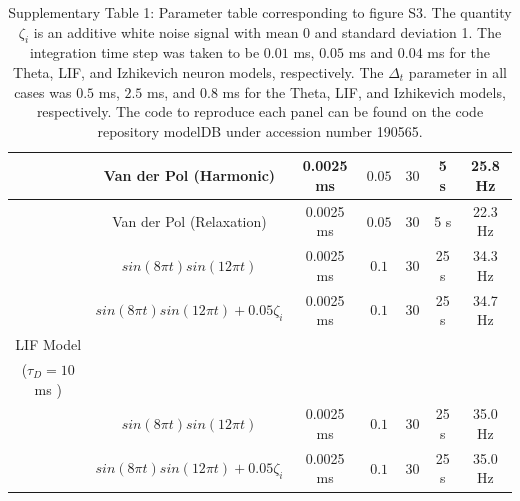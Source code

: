 \documentclass[11pt]{article} %
\begin{document}
\begin{table}
\begin{center}
\begin{tabular}{ | c | c | c | c | c | c | c | }
\hline 
 & Van der Pol (Harmonic) & 0.0025 ms & $0.05$ & $30$ & 5 s & 25.8 Hz \\  
\hline 
   & Van der Pol (Relaxation) & 0.0025 ms & $0.05 $ & $30$ & 5 s & 22.3 Hz \\  
\hline 
 & $sin(8\pi t)sin(12\pi t)$ & 0.0025 ms & $0.1$ & $30$ & 25 s & 34.3 Hz \\  
\hline 
 & $sin(8\pi t)sin(12\pi t) + 0.05 \zeta_i$ & 0.0025 ms & $0.1$ & $30 $ & 25 s & 34.7 Hz \\
\hline 
\hline
LIF Model  & & & & & & \\
($\tau_D = 10$ ms )  & & & & & & \\
\hline 
 & $sin(8\pi t)sin(12\pi t)$ & 0.0025 ms & $0.1$ & $30$ & 25 s & 35.0 Hz \\  
\hline  & $sin(8\pi t)sin(12\pi t) + 0.05 \zeta_i$ & 0.0025 ms & $0.1$ & $30 $ & 25 s & 35.0 Hz \\ 
\hline 
\hline
  \end{tabular}
\end{center}
\caption*{Supplementary Table 1:  Parameter table corresponding to figure S3.  The quantity $\zeta_i$ is an additive white noise signal with mean 0 and standard deviation 1.  The integration time step was taken to be $0.01$ ms, $0.05$ ms and $0.04$ ms for the Theta, LIF, and Izhikevich neuron models, respectively. The $\Delta_t$ parameter in all cases was $0.5 $ ms, $2.5$ ms, and $0.8$ ms for the Theta, LIF, and Izhikevich models, respectively.   
The code to reproduce each panel can be found on the code repository modelDB \cite{modeldb} under accession number 190565. } 
\end{table} 
\end{document}
